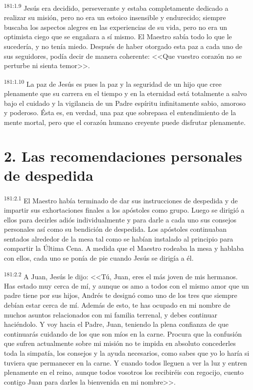 \par 
\textsuperscript{181:1.9} Jesús era decidido, perseverante y estaba completamente dedicado a realizar su misión, pero no era un estoico insensible y endurecido; siempre buscaba los aspectos alegres en las experiencias de su vida, pero no era un optimista ciego que se engañara a sí mismo. El Maestro sabía todo lo que le sucedería, y no tenía miedo. Después de haber otorgado esta paz a cada uno de sus seguidores, podía decir de manera coherente: <<Que vuestro corazón no se perturbe ni sienta temor>>.

\par 
\textsuperscript{181:1.10} La paz de Jesús es pues la paz y la seguridad de un hijo que cree plenamente que su carrera en el tiempo y en la eternidad está totalmente a salvo bajo el cuidado y la vigilancia de un Padre espíritu infinitamente sabio, amoroso y poderoso. Ésta es, en verdad, una paz que sobrepasa el entendimiento de la mente mortal, pero que el corazón humano creyente puede disfrutar plenamente.

\section*{2. Las recomendaciones personales de despedida}
\par 
\textsuperscript{181:2.1} El Maestro había terminado de dar sus instrucciones de despedida y de impartir sus exhortaciones finales a los apóstoles como grupo. Luego se dirigió a ellos para decirles adiós individualmente y para darle a cada uno sus consejos personales así como su bendición de despedida. Los apóstoles continuaban sentados alrededor de la mesa tal como se habían instalado al principio para compartir la Última Cena. A medida que el Maestro rodeaba la mesa y hablaba con ellos, cada uno se ponía de pie cuando Jesús se dirigía a él.

\par 
\textsuperscript{181:2.2} A Juan, Jesús le dijo: <<Tú, Juan, eres el más joven de mis hermanos. Has estado muy cerca de mí, y aunque os amo a todos con el mismo amor que un padre tiene por sus hijos, Andrés te designó como uno de los tres que siempre debían estar cerca de mí. Además de esto, te has ocupado en mi nombre de muchos asuntos relacionados con mi familia terrenal, y debes continuar haciéndolo. Y voy hacia el Padre, Juan, teniendo la plena confianza de que continuarás cuidando de los que son míos en la carne. Procura que la confusión que sufren actualmente sobre mi misión no te impida en absoluto concederles toda la simpatía, los consejos y la ayuda necesarios, como sabes que yo lo haría si tuviera que permanecer en la carne. Y cuando todos lleguen a ver la luz y entren plenamente en el reino, aunque todos vosotros los recibiréis con regocijo, cuento contigo Juan para darles la bienvenida en mi nombre>>.

